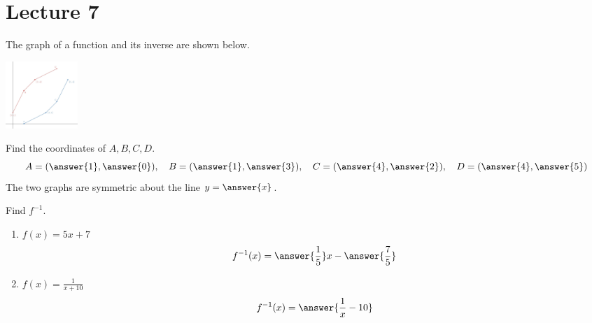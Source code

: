 \documentclass{ximera}
\begin{document}
\section{Lecture 7}
\begin{problem}\label{prob:160hom3prob3}
The graph of a function and its inverse are shown below.  
\begin{image}
   \includegraphics[height=1in]{160H3pic1.jpg}
 \end{image}
Find the coordinates of $A, B, C, D$.
$$A=(\answer{1},\answer{0}),\quad B=(\answer{1},\answer{3}),\quad C=(\answer{4},\answer{2}),\quad D=(\answer{4},\answer{5})$$
The two graphs are symmetric about the line
$y=\answer{x}$.
\end{problem}
\begin{problem}\label{prob:160hom3prob4}
Find $f^{-1}$.
\begin{enumerate}
    \item $f(x)=5x+7$
    $$f^{-1}(x)=\answer{\frac{1}{5}}x-\answer{\frac{7}{5}}$$
    \item $f(x)=\frac{1}{x+10}$
    $$f^{-1}(x)=\answer{\frac{1}{x}-10}$$
\end{enumerate}

\end{problem}
\end{document}
